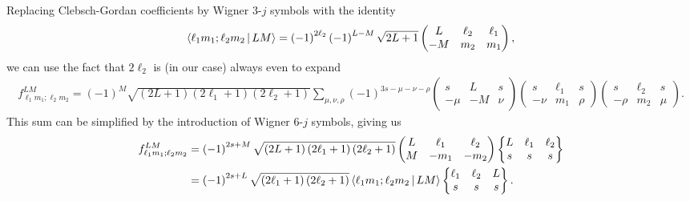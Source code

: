 \documentclass[notitlepage,twocolumn]{revtex4-2}
\newcommand{\p}[1]{\left(#1\right)} %
\newcommand{\bk}{\Braket} %
\newcommand{\1}{\mathds{1}}
\begin{document}
Replacing Clebsch-Gordan coefficients by Wigner 3-$j$ symbols with the identity
\begin{align}
  \bk{\ell_1 m_1; \ell_2 m_2| L M}
  = \p{-1}^{2\ell_2} \p{-1}^{L-M} \sqrt{2L+1}
  \begin{pmatrix}
    L & \ell_2 & \ell_1 \\
    -M & m_2 & m_1
  \end{pmatrix},
\end{align}
we can use the fact that $2\ell_2$ is (in our case) always even to expand
\begin{align}
  f_{\ell_1 m_1;\ell_2 m_2}^{LM}
  = \p{-1}^M \sqrt{\p{2L+1}\p{2\ell_1+1}\p{2\ell_2+1}}
  \sum_{\mu,\nu,\rho} \p{-1}^{3s-\mu-\nu-\rho}
  \begin{pmatrix}
    s & L & s \\
    -\mu & -M & \nu
  \end{pmatrix}
  \begin{pmatrix}
    s & \ell_1 & s \\
    -\nu & m_1 & \rho
  \end{pmatrix}
  \begin{pmatrix}
    s & \ell_2 & s \\
    -\rho & m_2 & \mu
  \end{pmatrix}.
\end{align}
This sum can be simplified by the introduction of Wigner 6-$j$ symbols, giving us
\begin{align}
  f_{\ell_1 m_1;\ell_2 m_2}^{LM}
  &= \p{-1}^{2s+M} \sqrt{\p{2L+1}\p{2\ell_1+1}\p{2\ell_2+1}}
  \begin{pmatrix}
    L & \ell_1 & \ell_2 \\
    M & -m_1 & -m_2
  \end{pmatrix}
  \begin{Bmatrix}
    L & \ell_1 & \ell_2 \\
    s & s & s
  \end{Bmatrix} \\
  &= \p{-1}^{2s+L} \sqrt{\p{2\ell_1+1}\p{2\ell_2+1}}
  \bk{\ell_1 m_1; \ell_2 m_2| LM}
  \begin{Bmatrix}
    \ell_1 & \ell_2 & L \\
    s & s & s
  \end{Bmatrix}.
\end{align}
\end{document}
